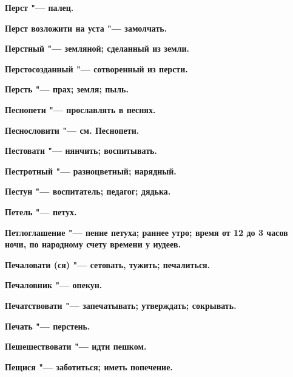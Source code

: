 \bfseries Перст \normalfont{} "--- палец. 




\bfseries Перст возложити на уста \normalfont{} "--- замолчать. 




\bfseries Перстный \normalfont{} "--- земляной; сделанный из земли. 




\bfseries Перстосозданный \normalfont{} "--- сотворенный из персти. 




\bfseries Персть \normalfont{} "--- прах; земля; пыль. 




\bfseries Песнопети \normalfont{} "--- прославлять в песнях. 




\bfseries Песнословити \normalfont{} "--- см. Песнопети. 




\bfseries Пестовати \normalfont{} "--- нянчить; воспитывать. 




\bfseries Пестротный \normalfont{} "--- разноцветный; нарядный. 




\bfseries Пестун \normalfont{} "--- воспитатель; педагог; дядька. 




\bfseries Петель \normalfont{} "--- петух. 




\bfseries Петлоглашение \normalfont{} "--- пение петуха; раннее утро; время от 12 до 3 часов ночи, по народному счету времени у иудеев. 




\bfseries Печаловати \normalfont{} (ся) "--- сетовать, тужить; печалиться. 




\bfseries Печаловник \normalfont{} "--- опекун. 




\bfseries Печатствовати \normalfont{} "--- запечатывать; утверждать; сокрывать. 




\bfseries Печать \normalfont{} "--- перстень. 




\bfseries Пешешествовати \normalfont{} "--- идти пешком. 




\bfseries Пещися \normalfont{} "--- заботиться; иметь попечение. 




